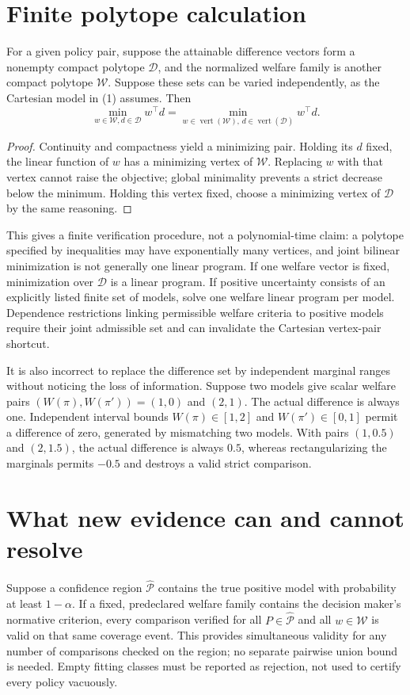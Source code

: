 \documentclass[11pt,a4paper]{article}
\begin{document}
\section{Finite polytope calculation}
For a given policy pair, suppose the attainable difference vectors form a nonempty compact polytope $\mathcal D$, and the normalized welfare family is another compact polytope $\mathcal W$. Suppose these sets can be varied independently, as the Cartesian model in (1) assumes. Then
\[
 \min_{w\in\mathcal W,d\in\mathcal D}w^\top d
 =\min_{w\in\operatorname{vert}(\mathcal W),\,
          d\in\operatorname{vert}(\mathcal D)}w^\top d.
\tag{4}
\]
\begin{proof}
Continuity and compactness yield a minimizing pair. Holding its $d$ fixed, the linear function of $w$ has a minimizing vertex of $\mathcal W$. Replacing $w$ with that vertex cannot raise the objective; global minimality prevents a strict decrease below the minimum. Holding this vertex fixed, choose a minimizing vertex of $\mathcal D$ by the same reasoning.
\end{proof}
This gives a finite verification procedure, not a polynomial-time claim: a polytope specified by inequalities may have exponentially many vertices, and joint bilinear minimization is not generally one linear program. If one welfare vector is fixed, minimization over $\mathcal D$ is a linear program. If positive uncertainty consists of an explicitly listed finite set of models, solve one welfare linear program per model. Dependence restrictions linking permissible welfare criteria to positive models require their joint admissible set and can invalidate the Cartesian vertex-pair shortcut.

It is also incorrect to replace the difference set by independent marginal ranges without noticing the loss of information. Suppose two models give scalar welfare pairs $(W(\pi),W(\pi'))=(1,0)$ and $(2,1)$. The actual difference is always one. Independent interval bounds $W(\pi)\in[1,2]$ and $W(\pi')\in[0,1]$ permit a difference of zero, generated by mismatching two models. With pairs $(1,0.5)$ and $(2,1.5)$, the actual difference is always $0.5$, whereas rectangularizing the marginals permits $-0.5$ and destroys a valid strict comparison.

\section{What new evidence can and cannot resolve}
Suppose a confidence region $\widehat{\mathcal P}$ contains the true positive model with probability at least $1-\alpha$. If a fixed, predeclared welfare family contains the decision maker's normative criterion, every comparison verified for all $P\in\widehat{\mathcal P}$ and all $w\in\mathcal W$ is valid on that same coverage event. This provides simultaneous validity for any number of comparisons checked on the region; no separate pairwise union bound is needed. Empty fitting classes must be reported as rejection, not used to certify every policy vacuously.
\end{document}
